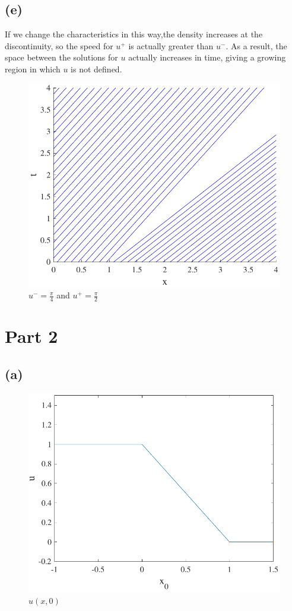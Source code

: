 \documentclass{article}
\begin{document}
\subsection*{(e)}
If we change the characteristics in this way,the density increases at the discontinuity, so the speed for $u^+$ is actually greater than $u^-$. As a result, the space between the solutions for $u$ actually increases in time, giving a growing region in which $u$ is not defined.
\begin{figure}[!htbp]
  \centering
    \includegraphics[width=\textwidth]{hw_14_plot2.pdf}
    \caption{$u^-=\frac{\pi}{4}$ and $u^+=\frac{\pi}{2}$}
\end{figure}
\FloatBarrier
\section*{Part 2}
\subsection*{(a)}
\begin{figure}[!htbp]
  \centering
    \includegraphics[width=\textwidth]{hw_14_plot3.pdf}
    \caption{$u(x, 0)$}
\end{figure}
\FloatBarrier
\end{document}
